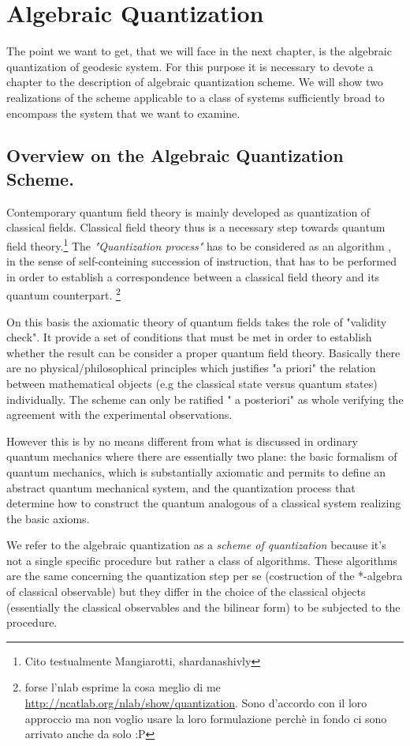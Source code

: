 \documentclass[Main]{subfiles}
\begin{document}
\chapter{Algebraic Quantization}
The point we want to get, that we will face in the next chapter, is the algebraic quantization of geodesic system.
For this purpose it is necessary to devote a chapter to the description of algebraic quantization scheme.
We will show two realizations of the scheme applicable to a class of systems sufficiently broad to encompass the system that we want to examine.

\section{Overview on the Algebraic Quantization Scheme.}
Contemporary quantum field theory is mainly developed as quantization of classical fields. Classical field theory thus is a necessary step towards quantum field theory.\danger \footnote{Cito testualmente Mangiarotti, shardanashivly}
The \emph{"Quantization process"} has to be considered as an algorithm , in the sense of self-conteining succession of instruction, that has to be performed in order to establish a correspondence between a classical field theory and its quantum counterpart.
\danger\footnote{forse l'nlab esprime la cosa meglio di me \url{http://ncatlab.org/nlab/show/quantization}. Sono d'accordo con il loro approccio ma non voglio usare la loro formulazione perchè in fondo ci sono arrivato anche da solo :P}

On this basis the axiomatic theory of quantum fields takes the role of "validity check". It provide a set of conditions that must be met in order to establish whether the result can be consider a proper quantum field theory.
Basically there are no physical/philosophical principles which justifies "a priori" the relation between mathematical objects (e.g the classical state versus quantum states) individually. The scheme can only be ratified " a posteriori" as whole verifying the agreement with the experimental observations.

However this is by no means different from what is discussed in ordinary quantum mechanics where there are essentially two plane:
the basic formalism of quantum mechanics, which is substantially axiomatic and permits to define an abstract quantum mechanical system, and the quantization process that determine how to construct the quantum analogous of a classical system realizing the basic axioms.

We refer to the algebraic quantization as a \emph{scheme of quantization} because it's not a single specific procedure but rather a class of algorithms.
These algorithms are the same concerning the quantization step per se (costruction of the *-algebra of classical observable) but they differ in the choice of the classical objects  (essentially the classical observables and the bilinear form) to be subjected to the procedure.
\end{document}
